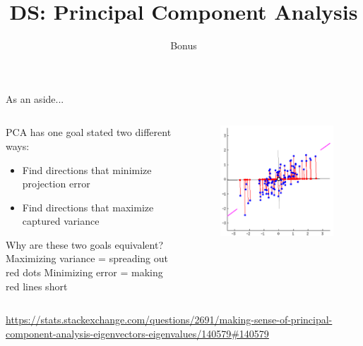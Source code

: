 \documentclass[aspectratio=169]{../latex_main/tntbeamer}  %
\title[Introduction]{DS: Principal Component Analysis}
\subtitle{Bonus}
\begin{document}
	
	\maketitle
	\begin{frame}{As an aside...}
	    \begin{columns}
	        \begin{column}{.4\textwidth}
	                PCA has one goal stated two different ways:
	                \begin{itemize}
	                    \item Find directions that minimize projection error
	                    \item Find directions that maximize captured variance
	                \end{itemize}
	                \bigskip
	                Why are these two goals equivalent?
                    Maximizing variance = spreading out red dots
                    Minimizing error = making red lines short
	        \end{column}
	        
	        
	        \begin{column}{.6\textwidth}
	                \begin{figure}
	                    \includegraphics[scale=.25]{Bild18}
	                \end{figure}
	        \end{column}
	    \end{columns}
	    \url{https://stats.stackexchange.com/questions/2691/making-sense-of-principal-component-analysis-eigenvectors-eigenvalues/140579#140579}

	\end{frame}
	
\end{document}
